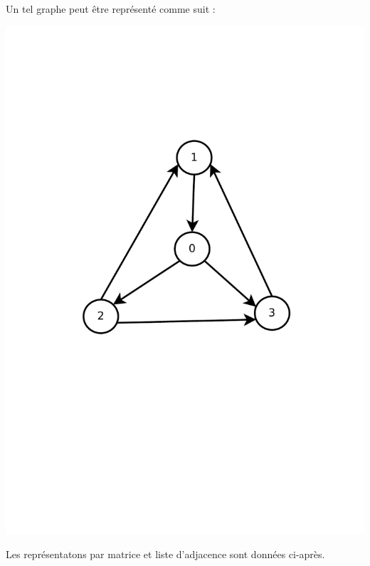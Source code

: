 \noindent
Un tel graphe peut être représenté comme suit : 

\begin{center}
	\includegraphics[scale=0.30]{exemple1_graphe.pdf}
\end{center}

Les représentatons par matrice et liste d'adjacence sont données ci-après.


